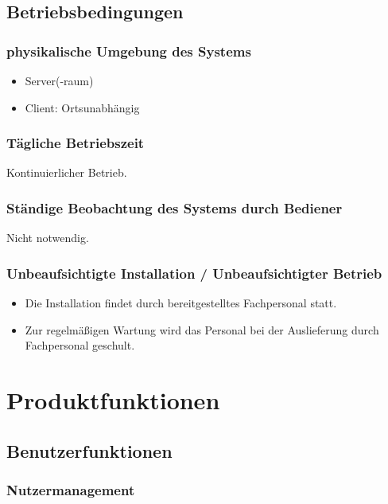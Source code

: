 \documentclass[a4paper,11pt]{scrartcl}
\begin{document}
	\subsection{Betriebsbedingungen}
		\subsubsection{physikalische Umgebung des Systems}
			\begin{itemize}
				\item Server(-raum)
				\item Client: Ortsunabhängig
			\end{itemize}
		\subsubsection{Tägliche Betriebszeit}
			Kontinuierlicher Betrieb.
		\subsubsection{Ständige Beobachtung des Systems durch Bediener}
			Nicht notwendig.
		\subsubsection{Unbeaufsichtigte Installation / Unbeaufsichtigter Betrieb}
			\begin{itemize}
				\item Die Installation findet durch bereitgestelltes Fachpersonal statt.
				\item Zur regelmäßigen Wartung wird das Personal bei der Auslieferung durch Fachpersonal geschult.
			\end{itemize}



\section{Produktfunktionen}
	\subsection{Benutzerfunktionen}
		\subsubsection{Nutzermanagement}
\end{document}
